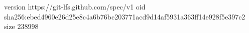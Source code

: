version https://git-lfs.github.com/spec/v1
oid sha256:ebed4960e26d25e8c4a6b76bc203771acd9d14af5931a363ff14e928f5e397c2
size 238998
